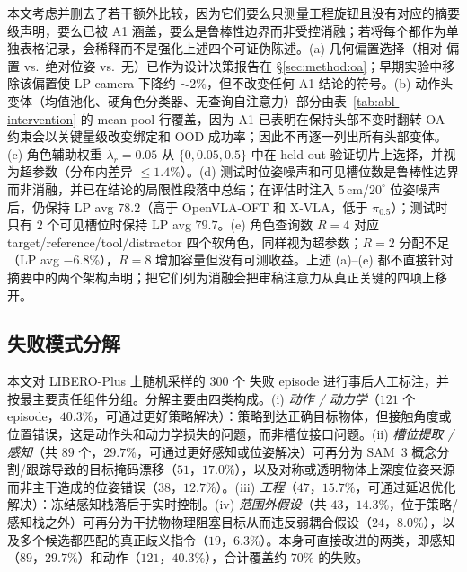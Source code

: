 本文考虑并删去了若干额外比较，因为它们要么只测量工程旋钮且没有对应的摘要级声明，要么已被 A1 涵盖，要么是鲁棒性边界而非受控消融；若将每个都作为单独表格记录，会稀释而不是强化上述四个可证伪陈述。(a) 几何偏置选择（相对 \se{} 偏置 vs.\ 绝对位姿 vs.\ 无）已作为设计决策报告在 \S\ref{sec:method:oa}；早期实验中移除该偏置使 LP camera 下降约 $\sim\!2$\%，但不改变任何 A1 结论的符号。(b) 动作头变体（均值池化、硬角色分类器、无查询自注意力）部分由表~\ref{tab:abl-intervention} 的 mean-pool 行覆盖，因为 A1 已表明在保持头部不变时翻转 OA 约束会以关键量级改变绑定和 OOD 成功率；因此不再逐一列出所有头部变体。(c) 角色辅助权重 $\lambda_r\!=\!0.05$ 从 $\{0,0.05,0.5\}$ 中在 held-out 验证切片上选择，并视为超参数（分布内差异 $\le 1.4$\%）。(d) 测试时位姿噪声和可见槽位数是鲁棒性边界而非消融，并已在结论的局限性段落中总结；在评估时注入 $5$\,cm/$20^\circ$ 位姿噪声后，\method{}仍保持 LP avg $78.2$（高于 OpenVLA-OFT 和 X-VLA，低于 $\pi_{0.5}$）；测试时只有 $2$ 个可见槽位时保持 LP avg $79.7$。(e) 角色查询数 $R\!=\!4$ 对应 target/reference/tool/distractor 四个软角色，同样视为超参数；$R\!=\!2$ 分配不足（LP avg $-6.8$\%），$R\!=\!8$ 增加容量但没有可测收益。上述 (a)--(e) 都不直接针对摘要中的两个架构声明；把它们列为消融会把审稿注意力从真正关键的四项上移开。

\subsection*{失败模式分解}
\label{app:failures}

本文对 LIBERO-Plus 上随机采样的 $300$ 个 \method{}失败 episode 进行事后人工标注，并按最主要责任组件分组。分解主要由四类构成。(i) \emph{动作 / 动力学}（$121$ 个 episode，$40.3\%$，可通过更好策略解决）：策略到达正确目标物体，但接触角度或位置错误，这是动作头和动力学损失的问题，而非槽位接口问题。(ii) \emph{槽位提取 / 感知}（共 $89$ 个，$29.7\%$，可通过更好感知或位姿解决）可再分为 SAM~3 概念分割/跟踪导致的目标掩码漂移（$51$，$17.0\%$），以及对称或透明物体上深度位姿来源而非主干造成的位姿错误（$38$，$12.7\%$）。(iii) \emph{工程}（$47$，$15.7\%$，可通过延迟优化解决）：冻结感知栈落后于实时控制。(iv) \emph{范围外假设}（共 $43$，$14.3\%$，位于策略/感知栈之外）可再分为干扰物物理阻塞目标从而违反弱耦合假设（$24$，$8.0\%$），以及多个候选都匹配的真正歧义指令（$19$，$6.3\%$）。\method{}本身可直接改进的两类，即感知（$89$，$29.7\%$）和动作（$121$，$40.3\%$），合计覆盖约 $70\%$ 的失败。


